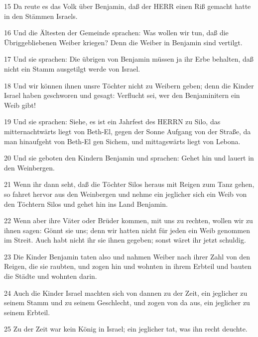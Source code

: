 \par 15 Da reute es das Volk über Benjamin, daß der HERR einen Riß gemacht hatte in den Stämmen Israels.
\par 16 Und die Ältesten der Gemeinde sprachen: Was wollen wir tun, daß die Übriggebliebenen Weiber kriegen? Denn die Weiber in Benjamin sind vertilgt.
\par 17 Und sie sprachen: Die übrigen von Benjamin müssen ja ihr Erbe behalten, daß nicht ein Stamm ausgetilgt werde von Israel.
\par 18 Und wir können ihnen unsre Töchter nicht zu Weibern geben; denn die Kinder Israel haben geschworen und gesagt: Verflucht sei, wer den Benjaminitern ein Weib gibt!
\par 19 Und sie sprachen: Siehe, es ist ein Jahrfest des HERRN zu Silo, das mitternachtwärts liegt von Beth-El, gegen der Sonne Aufgang von der Straße, da man hinaufgeht von Beth-El gen Sichem, und mittagswärts liegt von Lebona.
\par 20 Und sie geboten den Kindern Benjamin und sprachen: Gehet hin und lauert in den Weinbergen.
\par 21 Wenn ihr dann seht, daß die Töchter Silos heraus mit Reigen zum Tanz gehen, so fahret hervor aus den Weinbergen und nehme ein jeglicher sich ein Weib von den Töchtern Silos und gehet hin ins Land Benjamin.
\par 22 Wenn aber ihre Väter oder Brüder kommen, mit uns zu rechten, wollen wir zu ihnen sagen: Gönnt sie uns; denn wir hatten nicht für jeden ein Weib genommen im Streit. Auch habt nicht ihr sie ihnen gegeben; sonst wäret ihr jetzt schuldig.
\par 23 Die Kinder Benjamin taten also und nahmen Weiber nach ihrer Zahl von den Reigen, die sie raubten, und zogen hin und wohnten in ihrem Erbteil und bauten die Städte und wohnten darin.
\par 24 Auch die Kinder Israel machten sich von dannen zu der Zeit, ein jeglicher zu seinem Stamm und zu seinem Geschlecht, und zogen von da aus, ein jeglicher zu seinem Erbteil.
\par 25 Zu der Zeit war kein König in Israel; ein jeglicher tat, was ihn recht deuchte.


